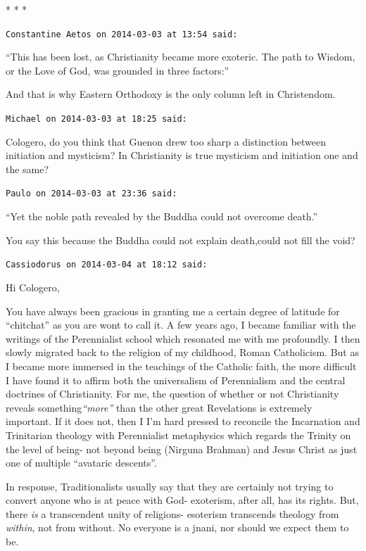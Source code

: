 \begin{center}* * *\end{center}

\begin{footnotesize}
\begin{sffamily}
\texttt{Constantine Aetos on 2014-03-03 at 13:54 said:}

``This has been lost, as Christianity became more exoteric. The path to Wisdom, or the Love of God, was grounded in three factors:''

And that is why Eastern Orthodoxy is the only column left in Christendom.

\hfill

\texttt{Michael on 2014-03-03 at 18:25 said:}

Cologero, do you think that Guenon drew too sharp a distinction between initiation and mysticism? In Christianity is true mysticism and initiation one and the same?


\hfill

\texttt{Paulo on 2014-03-03 at 23:36 said:}

``Yet the noble path revealed by the Buddha could not overcome death.''

You say this because the Buddha could not explain death,could not fill the void?

\hfill

\texttt{Cassiodorus on 2014-03-04 at 18:12 said:}

Hi Cologero,

You have always been gracious in granting me a certain degree of latitude for ``chitchat'' as you are wont to call it. A few years ago, I became familiar with the writings of the Perennialist school which resonated me with me profoundly. I then slowly migrated back to the religion of my childhood, Roman Catholicism. But as I became more immersed in the teachings of the Catholic faith, the more difficult I have found it to affirm both the universalism of Perennialism and the central doctrines of Christianity. For me, the question of whether or not Christianity reveals something\emph{``more''} than the other great Revelations is extremely important. If it does not, then I I'm hard pressed to reconcile the Incarnation and Trinitarian theology with Perennialist metaphysics which regards the Trinity on the level of being- not beyond being (Nirguna Brahman) and Jesus Christ as just one of multiple ``avataric descents''.

In response, Traditionalists usually say that they are certainly not trying to convert anyone who is at peace with God- exoterism, after all, has its rights. But, there \emph{is} a transcendent unity of religions- esoterism transcends theology from \emph{within}, not from without. No everyone is a jnani, nor should we expect them to be.


\end{sffamily}
\end{footnotesize}
